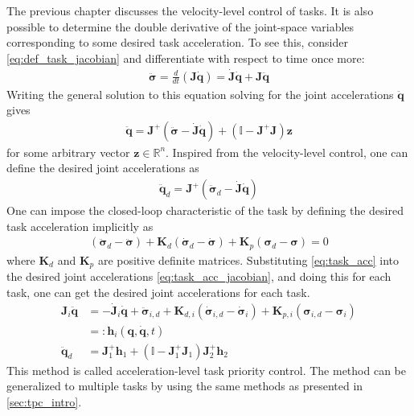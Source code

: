 The previous chapter discusses the velocity-level control of tasks. It is also 
possible to determine the double derivative of the joint-space variables corresponding to some
desired task acceleration. To see this, consider \autoref{eq:def_task_jacobian} and differentiate
with respect to time once more:
\begin{align}
    \ddot{\bm{\sigma}} = \frac{d}{dt}\left(\bm{J} \dot{\bm{q}}\right) = \dot{\bm{J}} \dot{\bm{q}} + \bm{J} \ddot{\bm{q}}
    \label{eq:task_acc_jacobian}
\end{align}
Writing the general solution to this equation solving for the joint accelerations
$\ddot{\bm{q}}$ gives
\begin{align}
    \ddot{\bm{q}} = \bm{J}^{+} \left(\ddot{\bm{\sigma}} - \dot{\bm{J}}\dot{\bm{q}}\right) +
    \left(\mathbb{I} - \bm{J}^{+}\bm{J}\right) \bm{z} \label{eq:task_acc_control}
\end{align}
for some arbitrary vector $\bm{z} \in \mathbb{R}^n$. Inspired from the
velocity-level control, one can define the desired joint accelerations as
\begin{align}
    \ddot{\bm{q}}_d = \bm{J}^{+} \left(\ddot{\bm{\sigma}}_d
    - \dot{\bm{J}}\dot{\bm{q}}\right) \label{eq:task_priority_acc}
\end{align}
One can impose the closed-loop characteristic of the task by defining the desired
task acceleration implicitly as
\begin{align}
    \left(\ddot{\bm{\sigma}}_d - \ddot{\bm{\sigma}}\right) +
    \bm{K}_d\left(\dot{\bm{\sigma}}_d - \dot{\bm{\sigma}}\right) +
    \bm{K}_p\left(\bm{\sigma}_d - \bm{\sigma}\right) = 0 \label{eq:task_acc}
\end{align}
where $\bm{K}_d$ and $\bm{K}_p$ are positive definite matrices. Substituting
\autoref{eq:task_acc} into the desired joint accelerations \autoref{eq:task_acc_jacobian},
and doing this for each task, one can get the desired joint accelerations for each task.
\begin{subequations}
\begin{align}
    \bm{J}_i\ddot{\bm{q}} &= -\dot{\bm{J}}_i\dot{\bm{q}} + \ddot{\bm{\sigma}}_{i,d} 
    + \bm{K}_{d,i}\left(\dot{\bm{\sigma}}_{i,d} - \dot{\bm{\sigma}}_i\right)
    + \bm{K}_{p,i}\left(\bm{\sigma}_{i,d} - \bm{\sigma}_i\right) \\
    &=: \bm{h}_i(\bm{q}, \dot{\bm{q}}, t) \\
    \ddot{\bm{q}}_d &= \bm{J}_1^{+} \bm{h}_1 + \left(\mathbb{I} - \bm{J}_1^+\bm{J}_1\right) \bm{J}_2^{+} \bm{h}_2
\end{align}
\end{subequations}
This method is called acceleration-level task priority control. The method can
be generalized to multiple tasks by using the same methods as presented in \autoref{sec:tpc_intro}.

